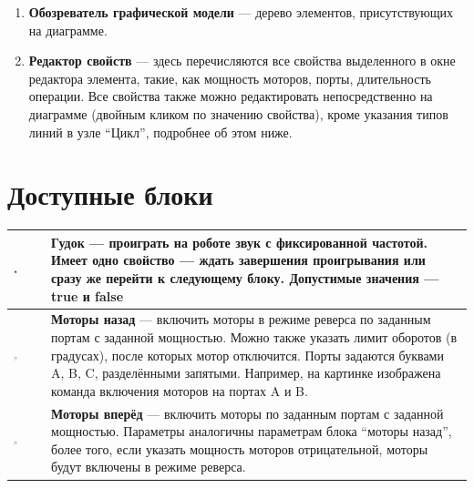 \documentclass[a4paper,12pt,twoside]{article}
\begin{document}
\begin{enumerate}
  \item \textbf{Обозреватель графической модели} --- дерево элементов, присутствующих на диаграмме. 
  \item \textbf{Редактор свойств} --- здесь перечисляются все свойства выделенного в окне редактора элемента, такие, как мощность моторов, порты, длительность операции. Все свойства также можно редактировать непосредственно на диаграмме (двойным кликом по значению свойства), кроме указания типов линий в узле "`Цикл"', подробнее об этом ниже.
\end{enumerate}

\section{Доступные блоки}

\begin{center}
	\begin{tabular}{m{} | m{}}
    {\vspace{10pt}\includegraphics[width=0.15\textwidth]{Beep.png}}          & \textbf{Гудок} --- проиграть на роботе звук с фиксированной частотой. Имеет одно свойство --- ждать завершения проигрывания или сразу же перейти к следующему блоку. Допустимые значения --- true и false\\ \hline
    {\vspace{10pt}\includegraphics[width=0.15\textwidth]{MotorBackward.png}} & \textbf{Моторы назад} --- включить моторы в режиме реверса по заданным портам с заданной мощностью. Можно также указать лимит оборотов (в градусах), после которых мотор отключится. Порты задаются буквами A, B, C, разделёнными запятыми. Например, на картинке изображена команда включения моторов на портах A и B. \\ \hline
    {\vspace{10pt}\includegraphics[width=0.15\textwidth]{MotorForward.png}}  & \textbf{Моторы вперёд} --- включить моторы по заданным портам с заданной мощностью. Параметры аналогичны параметрам блока "`моторы назад"', более того, если указать мощность моторов отрицательной, моторы будут включены в режиме реверса. \\  \hline

\end{tabular}
\end{center}
\end{document}
